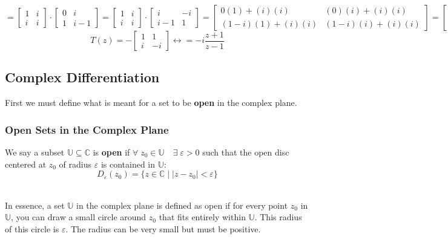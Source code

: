 \documentclass[a4paper, 10pt]{article}
\begin{document}
\begin{examplebox}
  \scriptsize$$
    = \begin{bmatrix}1 & i \\ i & i\end{bmatrix} \cdot \begin{bmatrix}0 & i \\ 1 & i-1\end{bmatrix}
    = \begin{bmatrix}1 & i \\ i & i\end{bmatrix} \cdot \begin{bmatrix}i & -i \\ i-1 & 1\end{bmatrix}
    = \begin{bmatrix} 0(1) + (i)(i) & (0)(i) + (i)(i) \\ (1-i)(1)+ (i)(i) & (1-i)(i) + (i)(i)\end{bmatrix}
    = \begin{bmatrix} i^2 & i^2 \\ -i & i\end{bmatrix}
  $$
  \normalsize$$T(z)  = -\begin{bmatrix}1 & 1 \\ i & -i \end{bmatrix}\longleftrightarrow = -i \frac{z+1}{z-1}$$

\end{examplebox}

\pagebreak

\subsection{Complex Differentiation}
First we must define what is meant for a set to be \textbf{open} in the complex plane.
\subsubsection{Open Sets in the Complex Plane}
\begin{definitionbox}
  We say a subset $\mathbb{U} \subseteq \mathbb{C}$ is \textbf{open} if $\forall\;  z_0 \in \mathbb{U} \quad \exists \; \varepsilon   > 0$
  such that the open disc centered at $z_0$ of radius $\varepsilon$ is contained in $\mathbb{U}$:
  $$D_{\varepsilon} (z_0) = \{z \in \mathbb{C} \mid |z-z_0| < \varepsilon\}$$ \\
  \centering
\end{definitionbox}
\noindent In essence, a set $\mathbb{U}$ in the complex plane is defined as open if for every point $z_0$ in $\mathbb{U}$,
you can draw a small circle around $z_0$ that fits entirely within $\mathbb{U}$. This radius of this circle is $\varepsilon$. The
radius can be very small but must be positive.
\end{document}

